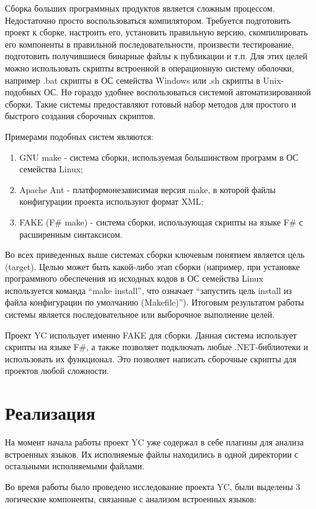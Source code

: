 \documentclass{matmex-diploma-custom}
\begin{document}
Сборка больших программных продуктов является сложным процессом. Недостаточно просто воспользоваться компилятором. Требуется подготовить проект к сборке, настроить его, установить правильную версию, скомпилировать его компоненты в правильной последовательности, произвести тестирование, подготовить получившиеся бинарные файлы к публикации и т.п. Для этих целей можно использовать скрипты встроенной в операционную систему оболочки, например .bat скрипты в ОС семейства Windows или .sh скрипты в Unix-подобных ОС. Но гораздо удобнее воспользоваться системой автоматизированной сборки. Такие системы предоставляют готовый набор методов для простого и быстрого создания сборочных скриптов.

Примерами подобных систем являются:

\begin{enumerate}
\item
GNU make - система сборки, используемая большинством программ в ОС семейства Linux;
\item
Apache Ant - платформонезависимая версия make, в которой файлы конфигурации проекта используют формат XML;
\item
FAKE (F\# make) - система сборки, использующая скрипты на языке F\# с расширенным синтаксисом.
\end{enumerate}

Во всех приведенных выше системах сборки ключевым понятием является цель (target). Целью может быть какой-либо этап сборки (например, при установке программного обеспечения из исходных кодов в ОС семейства Linux используется команда “make install”, что означает “запустить цель install из файла конфигурации по умолчанию (Makefile)”). Итоговым результатом работы системы является последовательное или выборочное выполнение целей.

Проект YC использует именно FAKE для сборки. Данная система использует скрипты на языке F\#, а также позволяет подключать любые .NET-библиотеки и использовать их функционал. Это позволяет написать сборочные скрипты для проектов любой сложности.

\section{Реализация}

На момент начала работы проект YC уже содержал в себе плагины для анализа встроенных языков. Их исполняемые файлы находились в одной директории с остальными исполняемыми файлами.

Во время работы было проведено исследование проекта YC, были выделены 3 логические компоненты, связанные с анализом встроенных языков:
\end{document}
